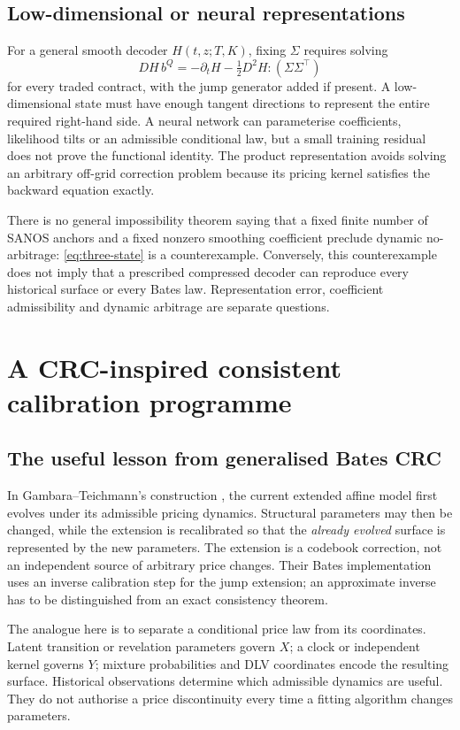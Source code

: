 \documentclass[11pt,a4paper]{article}
\numberwithin{equation}{section}
\theoremstyle{definition}\newtheorem{definition}[theorem]{Definition}
\theoremstyle{remark}\newtheorem{remark}[theorem]{Remark}
\begin{document}
\subsection{Low-dimensional or neural representations}
For a general smooth decoder $H(t,z;T,K)$, fixing $\Sigma$ requires solving
\begin{equation}
 DH\,b^Q=-\partial_tH-\tfrac12D^2H:(\Sigma\Sigma^\top)
 \label{eq:range-decoder}
\end{equation}
for every traded contract, with the jump generator added if present. A low-dimensional state must have enough tangent directions to represent the entire required right-hand side. A neural network can parameterise coefficients, likelihood tilts or an admissible conditional law, but a small training residual does not prove the functional identity. The product representation avoids solving an arbitrary off-grid correction problem because its pricing kernel satisfies the backward equation exactly.

There is no general impossibility theorem saying that a fixed finite number of SANOS anchors and a fixed nonzero smoothing coefficient preclude dynamic no-arbitrage: \eqref{eq:three-state} is a counterexample. Conversely, this counterexample does not imply that a prescribed compressed decoder can reproduce every historical surface or every Bates law. Representation error, coefficient admissibility and dynamic arbitrage are separate questions.

\section{A CRC-inspired consistent calibration programme}
\label{sec:crc}
\subsection{The useful lesson from generalised Bates CRC}
In Gambara--Teichmann's construction \cite{CRC}, the current extended affine model first evolves under its admissible pricing dynamics. Structural parameters may then be changed, while the extension is recalibrated so that the \emph{already evolved} surface is represented by the new parameters. The extension is a codebook correction, not an independent source of arbitrary price changes. Their Bates implementation uses an inverse calibration step for the jump extension; an approximate inverse has to be distinguished from an exact consistency theorem.

The analogue here is to separate a conditional price law from its coordinates. Latent transition or revelation parameters govern $X$; a clock or independent kernel governs $Y$; mixture probabilities and DLV coordinates encode the resulting surface. Historical observations determine which admissible dynamics are useful. They do not authorise a price discontinuity every time a fitting algorithm changes parameters.
\end{document}
